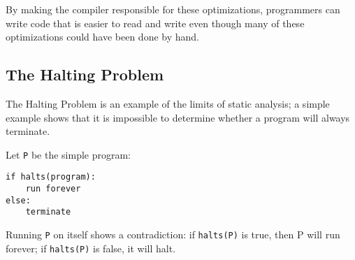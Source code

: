 \documentclass[twoside]{article}
\begin{document}
By making the compiler responsible for these optimizations, programmers can write code that is easier to read and write even though many of these optimizations could have been done by hand. 

\subsection{The Halting Problem}
The Halting Problem is an example of the limits of static analysis; a simple example shows that it is impossible to determine whether a program will always terminate. \par 

Let \texttt{P} be the simple program: 
\begin{verbatim}
if halts(program): 
    run forever
else: 
    terminate
\end{verbatim}

Running \texttt{P} on itself shows a contradiction: if \texttt{halts(P)} is true, then P will run forever; if \texttt{halts(P)} is false, it will halt.
\end{document}
